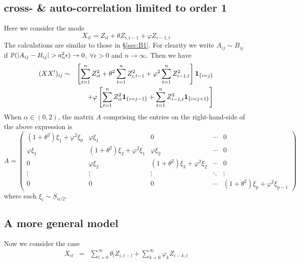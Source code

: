 \documentclass{article}
\begin{document}
\subsection{cross- \& auto-correlation limited to order 1}
Here we consider the mode
\[
X_{it} = Z_{it} + \theta Z_{i, t-1} + \varphi Z_{i-1, t}
\]
The calculations are similar to those in \S\ref{sec:B1}. For clearity
we write $A_{ij} \sim B_{ij}$ if $\mathbb{P}(|A_{ij} - B_{ij}| > a_n^2 \epsilon)
\to 0$, $\forall \epsilon > 0$ and $n \to \infty$. Then we have
\begin{eqnarray*}
  (XX')_{ij} &\sim& \left[
    \sum_{t=1}^n Z_{it}^2 + \theta^2 \sum_{t=1}^n Z_{i,t-1}^2 +
    \varphi^2 \sum_{t=1}^n Z_{i-1,t}^2 
  \right]\mathbf{1}_{\{i=j\}} \\
  && + \varphi \left[
    \sum_{t=1}^n Z_{it}^2 \mathbf{1}_{\{i=j-1\}} + \sum_{t=1}^n Z_{i-1, t}^2 \mathbf{1}_{\{i=j+1\}}
  \right]
\end{eqnarray*}
When $\alpha \in (0,2)$, the matrix $A$ comprising the entries on the
right-hand-side of the above expression is
\[
A =
\begin{pmatrix}
  (1 + \theta^2)\xi_1 + \varphi^2 \xi_0 & \varphi \xi_1 & 0 & \cdots & 0 \\
  \varphi \xi_1 & (1 + \theta^2)\xi_2 + \varphi^2 \xi_1 & \varphi \xi_2 & \cdots & 0 \\
  0 & \varphi \xi_2 & (1 + \theta^2)\xi_3 + \varphi^2 \xi_2 & \cdots & 0 \\
  \vdots & \vdots & \vdots & \ddots & \vdots \\
  0 & 0 & 0 & \cdots & (1 + \theta^2)\xi_p + \varphi^2 \xi_{p-1}
\end{pmatrix}
\]
where each $\xi_i \sim S_{\alpha/2}$.

\subsection{A more general model}
Now we consider the case
\begin{eqnarray*}
  X_{it} &=& \sum_{l=0}^\infty \theta_l Z_{i,t-l} + \sum_{k=0}^\infty
  \varphi_k Z_{i-k,t}
\end{eqnarray*}
\end{document}
